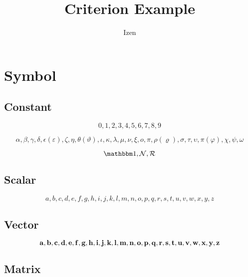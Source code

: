 \documentclass[a4paper,11pt]{article}
\title{Criterion Example}
\author{Izen}
\begin{document}

\section{Symbol} %
\label{sec:symbol}

\subsection{Constant} %
\label{sub:constant}

\begin{equation*}
0, 1, 2, 3, 4, 5, 6, 7, 8, 9
\end{equation*}

\begin{equation*}
\alpha, \beta, \gamma, \delta, \epsilon (\varepsilon), \zeta, \eta, \theta (\vartheta), \iota, \kappa, \lambda, \mu, \nu, \xi, o, \pi, \rho (\varrho), \sigma, \tau, \upsilon, \pi (\varphi), \chi, \psi, \omega
\end{equation*}

\begin{equation*}
	\bin, \nat, \real
\end{equation*}

\subsection{Scalar}
\label{sub:scalar}

\begin{equation*}
a, b, c, d, e, f, g, h, i, j, k, l, m, n, o, p, q, r, s, t, u, v, w, x, y, z
\end{equation*}

\subsection{Vector}
\label{sub:vector}

\begin{equation*}
\mathbf{a}, \mathbf{b}, \mathbf{c}, \mathbf{d}, \mathbf{e}, \mathbf{f}, \mathbf{g}, \mathbf{h}, \mathbf{i}, \mathbf{j}, \mathbf{k}, \mathbf{l}, \mathbf{m}, \mathbf{n}, \mathbf{o}, \mathbf{p}, \mathbf{q}, \mathbf{r}, \mathbf{s}, \mathbf{t}, \mathbf{u}, \mathbf{v}, \mathbf{w}, \mathbf{x}, \mathbf{y}, \mathbf{z}
\end{equation*}

\subsection{Matrix}
\label{sub:matrix}
\end{document}
